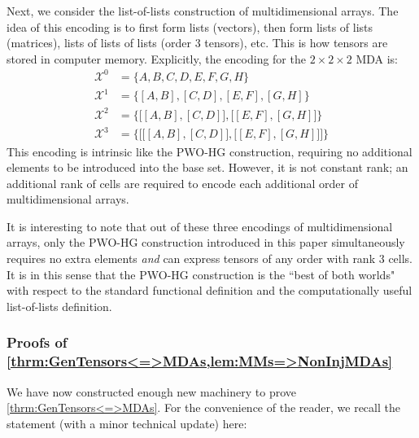 \documentclass{article}
\theoremstyle{plain}
\theoremstyle{definition}
\theoremstyle{remark}
\newcommand{\cX}{\mathcal{X}}
\begin{document}
Next, we consider the list-of-lists construction of multidimensional arrays. The idea of this encoding is to first form lists (vectors), then form lists of lists (matrices), lists of lists of lists (order $3$ tensors), etc. This is how tensors are stored in computer memory. Explicitly, the encoding for the $2 \times 2 \times 2$ MDA is:
\begin{equation*}
	\begin{aligned}
		\cX^0 &= \{ A, B, C, D, E, F, G, H\}\\
		\cX^1 &= \big\{ [A,B], [C,D], [E,F], [G,H]\big\}\\
		\cX^2 &= \Big\{ \big[ [A,B], [C,D] \big], \big[ [E,F], [G,H] \big]\Big\}\\
		\cX^3 &= \Bigg\{ \Big[ \big[ [A,B], [C,D] \big], \big[ [E,F], [G,H] \big]\Big] \Bigg\}
	\end{aligned}
\end{equation*}
This encoding is intrinsic like the PWO-HG construction, requiring no additional elements to be introduced into the base set. However, it is not constant rank; an additional rank of cells are required to encode each additional order of multidimensional arrays.

It is interesting to note that out of these three encodings of multidimensional arrays, only the PWO-HG construction introduced in this paper simultaneously requires no extra elements \textit{and} can express tensors of any order with rank $3$ cells. It is in this sense that the PWO-HG construction is the ``best of both worlds" with respect to the standard functional definition and the computationally useful list-of-lists definition.

\subsubsection{\label{sec:GenTenProofs_Apdx}Proofs of \cref{thrm:GenTensors<=>MDAs,lem:MMs=>NonInjMDAs}}
We have now constructed enough new machinery to prove \cref{thrm:GenTensors<=>MDAs}. For the convenience of the reader, we recall the statement (with a minor technical update) here:
\end{document}
